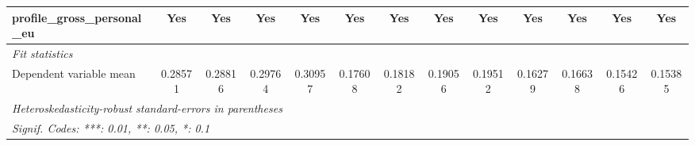\begin{tabular}{lcccccccccccc}
   profile\_gross\_personal\_eu              & Yes     & Yes     & Yes     & Yes     & Yes          & Yes     & Yes     & Yes     & Yes     & Yes     & Yes     & Yes\\  
   \midrule
   \emph{Fit statistics}\\
   Dependent variable mean                   & 0.28571 & 0.28816 & 0.29764 & 0.30957 & 0.17608      & 0.18182 & 0.19056 & 0.19512 & 0.16279 & 0.16638 & 0.15426 & 0.15385\\  
   \midrule \midrule
   \multicolumn{13}{l}{\emph{Heteroskedasticity-robust standard-errors in parentheses}}\\
   \multicolumn{13}{l}{\emph{Signif. Codes: ***: 0.01, **: 0.05, *: 0.1}}\\
\end{tabular}
\par\endgroup


